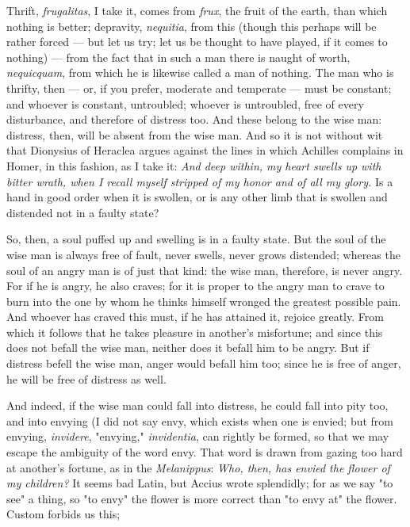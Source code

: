  Thrift, \textit{frugalitas}, I take it, comes from \textit{frux}, the fruit of the earth, than which nothing is better; depravity, \textit{nequitia}, from this (though this perhaps will be rather forced — but let us try; let us be thought to have played, if it comes to nothing) — from the fact that in such a man there is naught of worth, \textit{nequicquam}, from which he is likewise called a man of nothing. The man who is thrifty, then — or, if you prefer, moderate and temperate — must be constant; and whoever is constant, untroubled; whoever is untroubled, free of every disturbance, and therefore of distress too. And these belong to the wise man: distress, then, will be absent from the wise man. And so it is not without wit that Dionysius of Heraclea argues against the lines in which Achilles complains in Homer, in this fashion, as I take it: \textit{And deep within, my heart swells up with bitter wrath, when I recall myself stripped of my honor and of all my glory.} Is a hand in good order when it is swollen, or is any other limb that is swollen and distended not in a faulty state?

 So, then, a soul puffed up and swelling is in a faulty state. But the soul of the wise man is always free of fault, never swells, never grows distended; whereas the soul of an angry man is of just that kind: the wise man, therefore, is never angry. For if he is angry, he also craves; for it is proper to the angry man to crave to burn into the one by whom he thinks himself wronged the greatest possible pain. And whoever has craved this must, if he has attained it, rejoice greatly. From which it follows that he takes pleasure in another's misfortune; and since this does not befall the wise man, neither does it befall him to be angry. But if distress befell the wise man, anger would befall him too; since he is free of anger, he will be free of distress as well.

 And indeed, if the wise man could fall into distress, he could fall into pity too, and into envying (I did not say envy, which exists when one is envied; but from envying, \textit{invidere}, "envying," \textit{invidentia}, can rightly be formed, so that we may escape the ambiguity of the word envy. That word is drawn from gazing too hard at another's fortune, as in the \textit{Melanippus}: \textit{Who, then, has envied the flower of my children?} It seems bad Latin, but Accius wrote splendidly; for as we say "to see" a thing, so "to envy" the flower is more correct than "to envy at" the flower. Custom forbids us this;

